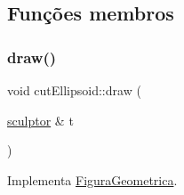 \begin{DoxyCode}{0}

\end{DoxyCode}


\subsection{Funções membros}
\mbox{\label{classcut_ellipsoid_aa0059cc77c6bb3d4c6c5dd9081ba07c1}} 
\subsubsection{\texorpdfstring{draw()}{draw()}}
{\footnotesize\ttfamily void cut\+Ellipsoid\+::draw (\begin{DoxyParamCaption}\item[{\mbox{\hyperlink{classsculptor}{sculptor}} \&}]{t }\end{DoxyParamCaption})\hspace{0.3cm}{\ttfamily [virtual]}}



Implementa \mbox{\hyperlink{class_figura_geometrica_ac996dac6561c450beaf5fd643e43e095}{Figura\+Geometrica}}.


